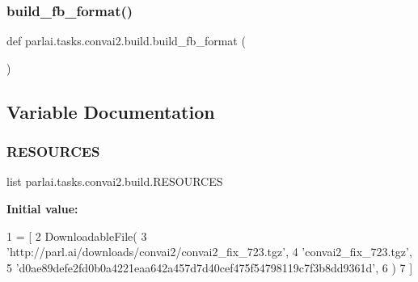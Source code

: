 \mbox{\label{namespaceparlai_1_1tasks_1_1convai2_1_1build_aac893ef8d5159621bc7086097270f7c1}} 
\subsubsection{\texorpdfstring{build\+\_\+fb\+\_\+format()}{build\_fb\_format()}}
{\footnotesize\ttfamily def parlai.\+tasks.\+convai2.\+build.\+build\+\_\+fb\+\_\+format (\begin{DoxyParamCaption}{ }\end{DoxyParamCaption})}



\subsection{Variable Documentation}
\mbox{\label{namespaceparlai_1_1tasks_1_1convai2_1_1build_a45995413b2766f076c1e1759a89009a6}} 
\subsubsection{\texorpdfstring{R\+E\+S\+O\+U\+R\+C\+ES}{RESOURCES}}
{\footnotesize\ttfamily list parlai.\+tasks.\+convai2.\+build.\+R\+E\+S\+O\+U\+R\+C\+ES}

{\bfseries Initial value\+:}
\begin{DoxyCode}
1 =  [
2     DownloadableFile(
3         \textcolor{stringliteral}{'http://parl.ai/downloads/convai2/convai2\_fix\_723.tgz'},
4         \textcolor{stringliteral}{'convai2\_fix\_723.tgz'},
5         \textcolor{stringliteral}{'d0ae89defe2fd0b0a4221eaa642a457d7d40cef475f54798119c7f3b8dd9361d'},
6     )
7 ]
\end{DoxyCode}
